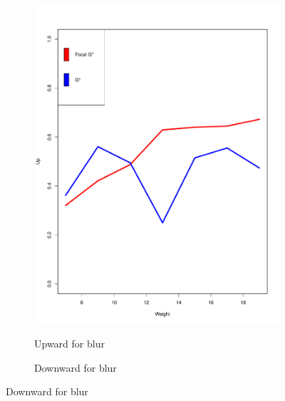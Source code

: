 \documentclass{itatnew}
\begin{document}
\begin{figure}[htp]
  \begin{subfigure}{\linewidth}
    \caption{Upward for blur}
    \includegraphics[width=\linewidth]{images/SoHUpBlur}
    \label{fig:UpwardBlur}
  \end{subfigure}
  \hspace{1em}
  \begin{subfigure}{\linewidth}
    \caption{Downward for blur}

\end{subfigure}
\end{figure}
\end{document}
